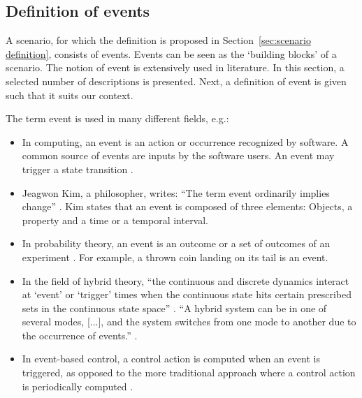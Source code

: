 \subsection{Definition of events}
\label{sec:events}
A scenario, for which the definition is proposed in Section~\ref{sec:scenario definition}, consists of events. Events can be seen as the `building blocks' of a scenario. The notion of event is extensively used in literature. In this section, a selected number of descriptions is presented. Next, a definition of event is given such that it suits our context.

The term event is used in many different fields, e.g.:
\begin{itemize}
	\item In computing, an event is an action or occurrence recognized by software. A common source of events are inputs by the software users. An event may trigger a state transition \cite{breu1997towards}.
	\item Jeagwon Kim, a philosopher, writes: ``The term event ordinarily implies change'' \cite{kim1993supervenience}. Kim states that an event is composed of three elements: Objects, a property and a time or a temporal interval. 
	\item In probability theory, an event is an outcome or a set of outcomes of an experiment \cite{pfeiffer2013concepts}. For example, a thrown coin landing on its tail is an event.
	\item In the field of hybrid theory, ``the continuous and discrete dynamics interact at `event' or `trigger' times when the continuous state hits certain prescribed sets in the continuous state space'' \cite{branicky1998hybridcontrol}. ``A hybrid system can be in one of several modes, [...], and the system switches from one mode to another due to the occurrence of events.'' \cite{deschutter2000optimal}.
	\item In event-based control, a control action is computed when an event is triggered, as opposed to the more traditional approach where a control action is periodically computed \cite{heemels2012eventcontrol}. 
\end{itemize}


